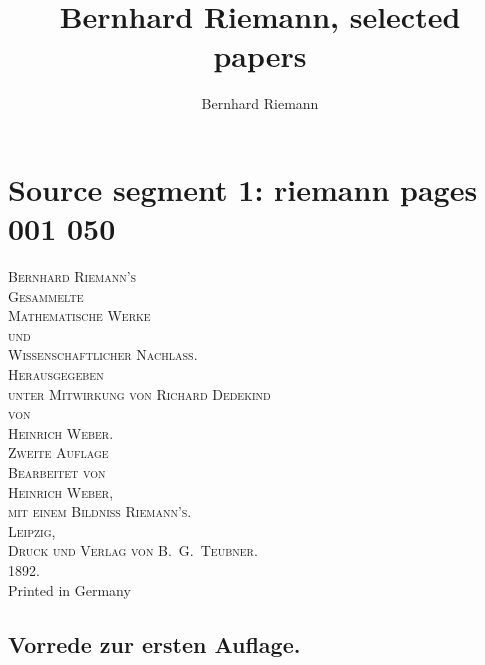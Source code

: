 \documentclass[12pt,a4paper]{book}
\theoremstyle{definition}
\theoremstyle{remark}
\begin{document}
\title{Bernhard Riemann, selected papers}
\author{Bernhard Riemann}
\maketitle
\tableofcontents

\clearpage
\chapter*{Source segment 1: riemann pages 001 050}
\thispagestyle{empty}
\begin{center}
\vspace*{2cm}
{\Large\textsc{Bernhard Riemann's}}\\[0.5cm]
{\LARGE\textsc{Gesammelte}}\\[0.3cm]
{\LARGE\textsc{Mathematische Werke}}\\[0.5cm]
{\large\textsc{und}}\\[0.5cm]
{\Large\textsc{Wissenschaftlicher Nachlass.}}\\[1.5cm]
{\large\textsc{Herausgegeben}}\\[0.3cm]
{\large\textsc{unter Mitwirkung von Richard Dedekind}}\\[0.3cm]
{\large\textsc{von}}\\[0.3cm]
{\Large\textsc{Heinrich Weber.}}\\[1.5cm]
{\large\textsc{Zweite Auflage}}\\[0.5cm]
{\normalsize\textsc{Bearbeitet von}}\\[0.3cm]
{\large\textsc{Heinrich Weber,}}\\[0.3cm]
{\small\textsc{mit einem Bildniss Riemann's.}}\\[1.5cm]
{\large\textsc{Leipzig,}}\\[0.3cm]
{\large\textsc{Druck und Verlag von B.\ G.\ Teubner.}}\\[0.5cm]
{\large\textsc{1892.}}\\[0.3cm]
{\small Printed in Germany}
\end{center}
\clearpage

\section*{Vorrede zur ersten Auflage.}
\end{document}
